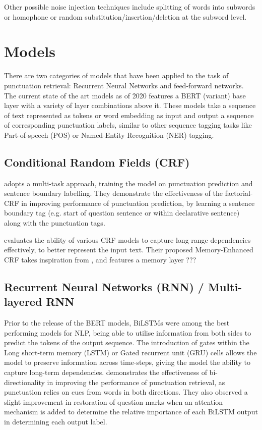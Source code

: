 \documentclass[a4paper]{article}
\begin{document}
Other possible noise injection techniques include splitting of words into subwords or homophone or random substitution/insertion/deletion at the subword level.

\section{Models}
There are two categories of models that have been applied to the task of punctuation retrieval: Recurrent Neural Networks and feed-forward networks.
The current state of the art models as of 2020 features a BERT (variant) base layer with a variety of layer combinations above it. These models take a sequence of text represented as tokens or word embedding as input and output a sequence of corresponding punctuation labels, similar to other sequence tagging tasks like Part-of-speech (POS) or Named-Entity Recognition (NER) tagging.
\subsection{Conditional Random Fields (CRF)}
\cite{dynamiccrf} adopts a multi-task approach, training the model on punctuation prediction and sentence boundary labelling. They demonstrate the effectiveness of the factorial-CRF in improving performance of punctuation prediction, by learning a sentence boundary tag (e.g. start of question sentence or within declarative sentence) along with the punctuation tags.

\cite{mecrf} evaluates the ability of various CRF models to capture long-range dependencies effectively, to better represent the input text. Their proposed Memory-Enhanced CRF takes inspiration from \cite{memnet}, and features a memory layer ???
\subsection{Recurrent Neural Networks (RNN) / Multi-layered RNN}
Prior to the release of the BERT models, BiLSTMs were among the best performing models for NLP, being able to utilise information from both sides to predict the tokens of the output sequence. The introduction of gates within the Long short-term memory (LSTM) or Gated recurrent unit (GRU) cells allows the model to preserve information across time-steps, giving the model the ability to capture long-term dependencies.  
\cite{birnnattention} demonstrates the effectiveness of bi-directionality in improving the performance of punctuation retrieval, as punctuation relies on cues from words in both directions. They also observed a slight improvement in restoration of question-marks when an attention mechanism is added to determine the relative importance of each BiLSTM output in determining each output label.
\end{document}
